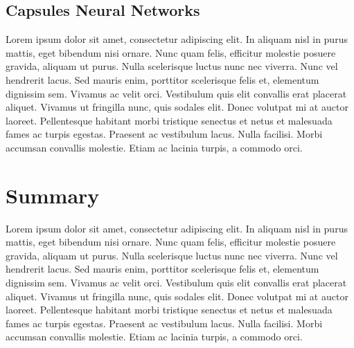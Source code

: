 \subsection{Capsules Neural Networks}\label{sec:3.7.4}
\vspace{-0.5cm}
\noindent  Lorem ipsum dolor sit amet, consectetur adipiscing elit. In aliquam nisl in purus mattis, eget bibendum nisi ornare. Nunc quam felis, efficitur molestie posuere gravida, aliquam ut purus. Nulla scelerisque luctus nunc nec viverra. Nunc vel hendrerit lacus. Sed mauris enim, porttitor scelerisque felis et, elementum dignissim sem. Vivamus ac velit orci. Vestibulum quis elit convallis erat placerat aliquet. Vivamus ut fringilla nunc, quis sodales elit. Donec volutpat mi at auctor laoreet. Pellentesque habitant morbi tristique senectus et netus et malesuada fames ac turpis egestas. Praesent ac vestibulum lacus. Nulla facilisi. Morbi accumsan convallis molestie. Etiam ac lacinia turpis, a commodo orci.


\vspace{-0.3cm}




\section{Summary}\label{sec:3.6}
\vspace{-0.5cm}
\noindent Lorem ipsum dolor sit amet, consectetur adipiscing elit. In aliquam nisl in purus mattis, eget bibendum nisi ornare. Nunc quam felis, efficitur molestie posuere gravida, aliquam ut purus. Nulla scelerisque luctus nunc nec viverra. Nunc vel hendrerit lacus. Sed mauris enim, porttitor scelerisque felis et, elementum dignissim sem. Vivamus ac velit orci. Vestibulum quis elit convallis erat placerat aliquet. Vivamus ut fringilla nunc, quis sodales elit. Donec volutpat mi at auctor laoreet. Pellentesque habitant morbi tristique senectus et netus et malesuada fames ac turpis egestas. Praesent ac vestibulum lacus. Nulla facilisi. Morbi accumsan convallis molestie. Etiam ac lacinia turpis, a commodo orci.

\vspace{-0.3cm}



